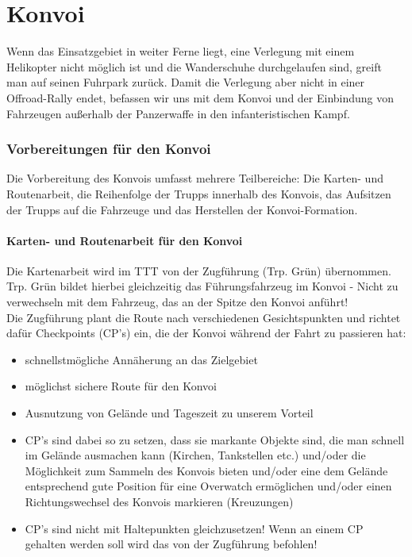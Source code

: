 \pagebreak
\chapter{Konvoi}
	Wenn das Einsatzgebiet in weiter Ferne liegt, eine Verlegung mit einem Helikopter nicht möglich ist und die Wanderschuhe durchgelaufen sind, greift man auf seinen Fuhrpark zurück. Damit die Verlegung aber nicht in einer Offroad-Rally endet, befassen wir uns mit dem Konvoi und der Einbindung von Fahrzeugen außerhalb der Panzerwaffe in den infanteristischen Kampf. 

\subsection{Vorbereitungen für den Konvoi}
	Die Vorbereitung des Konvois umfasst mehrere Teilbereiche: Die Karten- und Routenarbeit, die Reihenfolge der Trupps innerhalb des Konvois, das Aufsitzen der Trupps auf die Fahrzeuge und das Herstellen der Konvoi-Formation.

\subsubsection{Karten- und Routenarbeit für den Konvoi}
	Die Kartenarbeit wird im TTT von der Zugführung (Trp. Grün)  übernommen. Trp. Grün bildet hierbei gleichzeitig das Führungsfahrzeug im Konvoi - Nicht zu verwechseln mit dem Fahrzeug, das an der Spitze den Konvoi anführt! \\
	Die Zugführung plant die Route nach verschiedenen Gesichtspunkten und richtet dafür Checkpoints (CP's) ein, die der Konvoi während der Fahrt zu passieren hat: 

	\begin{itemize}
		\item schnellstmögliche Annäherung an das Zielgebiet
		\item möglichst sichere Route für den Konvoi
		\item Ausnutzung von Gelände und Tageszeit zu unserem Vorteil
		\item CP's sind dabei so zu setzen, dass sie markante Objekte sind, die man schnell im Gelände ausmachen kann (Kirchen, Tankstellen etc.) und/oder die Möglichkeit zum Sammeln des Konvois bieten und/oder eine dem Gelände entsprechend gute Position für eine Overwatch ermöglichen und/oder einen Richtungswechsel des Konvois markieren (Kreuzungen)
		\item CP's sind nicht mit Haltepunkten gleichzusetzen! Wenn an einem CP gehalten werden soll wird das von der Zugführung befohlen!
	\end{itemize}

